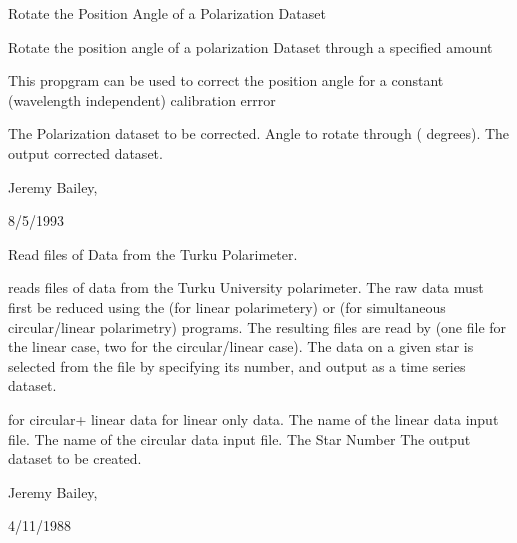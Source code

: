 \begin{manroutinedescription}
        Rotate the Position Angle of a Polarization Dataset

        Rotate the position angle of a polarization Dataset
        through a specified amount

        This propgram can be used to correct the position angle
        for a constant (wavelength independent) calibration errror

\begin{manparametertable}
  The Polarization %
dataset to be corrected.
     Angle to rotate through (%
degrees).
  The output %
corrected dataset.

\end{manparametertable}
         Jeremy Bailey, {}

         8/5/1993

\end{manroutinedescription}
\begin{manroutinedescription}
        Read {} files of Data from the Turku {} %
Polarimeter.

        {} reads {} files of data from the Turku %
University {}
        polarimeter. The raw data must first be reduced using the {}
        (for linear polarimetery) or {} (for simultaneous %
circular/linear
        polarimetry) programs. The resulting files are read by {}
        (one file for the linear case, two for the circular/linear case).
        The data on a given star is selected from the file by specifying
        its number, and output as a {} time series dataset.

\begin{manparametertable}
  {} for circular+%
linear data
                              {} for linear only data.
     The name of the linear data %
input file.
     The name of the circular %
data input file.
  The Star Number
  The %
output dataset to be created.


\end{manparametertable}
        Jeremy Bailey, {}

        4/11/1988

\end{manroutinedescription}
